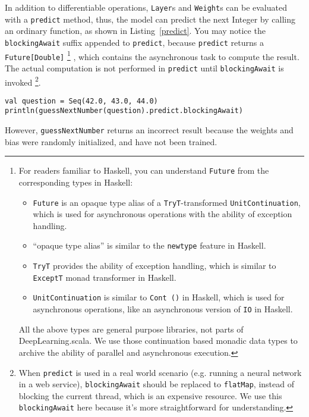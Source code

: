 In addition to differentiable operations, \lstinline{Layer}s and \lstinline{Weight}s can be evaluated with a \lstinline{predict} method, thus, the model can predict the next Integer by calling an ordinary function, as shown in Listing~\ref{predict}. 
You may notice the \lstinline{blockingAwait} suffix appended to \lstinline{predict}, because \lstinline{predict} returns a \lstinline{Future[Double]}
\footnote{ 
  For readers familiar to Haskell, you can understand \lstinline{Future} from the corresponding types in Haskell:
  \begin{itemize}
    \item \lstinline{Future} is an opaque type alias of a \lstinline{TryT}-transformed \lstinline{UnitContinuation}, which is used for asynchronous operations with the ability of exception handling.
    \item ``opaque type alias'' is similar to the \lstinline{newtype} feature in Haskell.
    \item \lstinline{TryT} provides the ability of exception handling, which is similar to \lstinline{ExceptT} monad transformer in Haskell.
    \item \lstinline{UnitContinuation} is similar to \lstinline{Cont ()} in Haskell, which is used for asynchronous operations, like an asynchronous version of \lstinline{IO} in Haskell.
  \end{itemize}
  All the above types are general purpose libraries, not parts of DeepLearning.scala. We use those continuation based monadic data types to archive the ability of parallel and asynchronous execution.
}
, which contains the asynchronous task to compute the result. The actual computation is not performed in  \lstinline{predict} until \lstinline{blockingAwait} is invoked \footnote{
  When \lstinline{predict} is used in a real world scenario (e.g. running a neural network in a web service), \lstinline{blockingAwait} should be replaced to \lstinline{flatMap}, instead of blocking the current thread, which is an expensive resource. We use this \lstinline{blockingAwait} here because it's more straightforward for understanding.
}.

\begin{lstlisting}[float={h t b p},caption={Inference on an untrained model},label={predict}]
val question = Seq(42.0, 43.0, 44.0)
println(guessNextNumber(question).predict.blockingAwait)
\end{lstlisting}

However, \lstinline{guessNextNumber} returns an incorrect result because the weights and bias were randomly initialized, and have not been trained.

